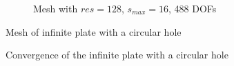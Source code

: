 \begin{figure}[H]\ContinuedFloat
    \begin{subfigure}[b]{1\linewidth}
        \centering
        \caption{Mesh with $res=128$, $s_{max}=16$, 488 DOFs}
    \end{subfigure}
    \caption[Mesh of the infinite plate with a circular hole]{Mesh of infinite plate with a circular hole}
    \label{qdt_fig:ex_chole_mesh_all}
\end{figure}


\begin{figure}[H]
    \centering
    \caption[Convergence of the infinite plate with a circular hole]{Convergence of the infinite plate with a circular hole}
    \label{qdt_fig:ex_chole_mesh_conv}
\end{figure}

\pagebreak